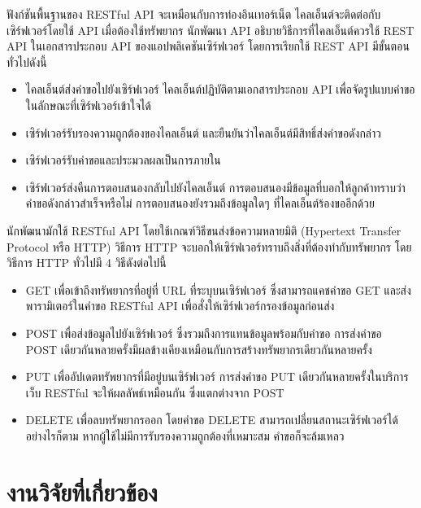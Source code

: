 \documentclass[12pt,oneside,openright,a4paper]{cpe-thai-project}
\begin{document}
    \hspace{1cm}ฟังก์ชันพื้นฐานของ RESTful API จะเหมือนกับการท่องอินเทอร์เน็ต ไคลเอ็นต์จะติดต่อกับเซิร์ฟเวอร์โดยใช้ API 
    เมื่อต้องใช้ทรัพยากร นักพัฒนา API อธิบายวิธีการที่ไคลเอ็นต์ควรใช้ REST API ในเอกสารประกอบ API ของแอปพลิเคชันเซิร์ฟเวอร์ 
    โดยการเรียกใช้ REST API มีขั้นตอนทั่วไปดังนี้
    \begin{itemize}
      \item ไคลเอ็นต์ส่งคำขอไปยังเซิร์ฟเวอร์ ไคลเอ็นต์ปฏิบัติตามเอกสารประกอบ API เพื่อจัดรูปแบบคำขอในลักษณะที่เซิร์ฟเวอร์เข้าใจได้
      \item เซิร์ฟเวอร์รับรองความถูกต้องของไคลเอ็นต์ และยืนยันว่าไคลเอ็นต์มีสิทธิ์ส่งคำขอดังกล่าว
      \item เซิร์ฟเวอร์รับคำขอและประมวลผลเป็นการภายใน
      \item เซิร์ฟเวอร์ส่งคืนการตอบสนองกลับไปยังไคลเอ็นต์ การตอบสนองมีข้อมูลที่บอกให้ลูกค้าทราบว่าคำขอดังกล่าวสำเร็จหรือไม่ การตอบสนองยังรวมถึงข้อมูลใดๆ ที่ไคลเอ็นต์ร้องขออีกด้วย
    \end{itemize}
    \hspace{1cm}นักพัฒนามักใช้ RESTful API โดยใช้เกณฑ์วิธีขนส่งข้อความหลายมิติ (Hypertext Transfer Protocol หรือ HTTP) 
    วิธีการ HTTP จะบอกให้เซิร์ฟเวอร์ทราบถึงสิ่งที่ต้องทำกับทรัพยากร โดยวิธีการ HTTP ทั่วไปมี 4 วิธีดังต่อไปนี้
    \begin{itemize}
      \item GET
            \newline เพื่อเข้าถึงทรัพยากรที่อยู่ที่ URL ที่ระบุบนเซิร์ฟเวอร์ ซึ่งสามารถแคชคำขอ GET และส่งพารามิเตอร์ในคำขอ RESTful API เพื่อสั่งให้เซิร์ฟเวอร์กรองข้อมูลก่อนส่ง
      \item POST
            \newline เพื่อส่งข้อมูลไปยังเซิร์ฟเวอร์ ซึ่งรวมถึงการแทนข้อมูลพร้อมกับคำขอ การส่งคำขอ POST เดียวกันหลายครั้งมีผลข้างเคียงเหมือนกับการสร้างทรัพยากรเดียวกันหลายครั้ง
      \item PUT
            \newline เพื่ออัปเดตทรัพยากรที่มีอยู่บนเซิร์ฟเวอร์ การส่งคำขอ PUT เดียวกันหลายครั้งในบริการเว็บ RESTful จะให้ผลลัพธ์เหมือนกัน ซึ่งแตกต่างจาก POST
      \item DELETE
            \newline เพื่อลบทรัพยากรออก โดยคำขอ DELETE สามารถเปลี่ยนสถานะเซิร์ฟเวอร์ได้ อย่างไรก็ตาม หากผู้ใช้ไม่มีการรับรองความถูกต้องที่เหมาะสม คำขอก็จะล้มเหลว
    \end{itemize}

\section{งานวิจัยที่เกี่ยวข้อง}
\end{document}
